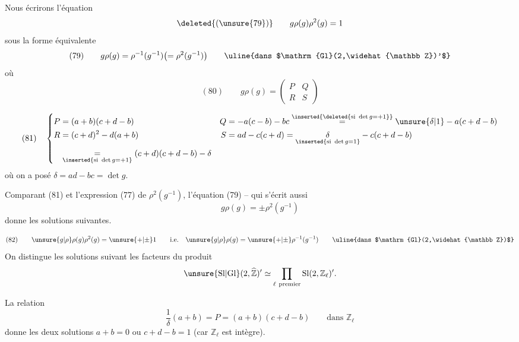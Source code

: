 Nous écrirons l'équation
\[
\deleted{(\unsure{79})}\qquad g\rho(g)\rho^2(g)=1
\]
sous la forme équivalente
\[
(79)\qquad g\rho(g)=\rho^{-1}(g^{-1})\bigl(=\rho^2(g^{-1})\bigr)
\qquad\text{\uline{dans $\mathrm{Gl}(2,\widehat{\mathbb Z})'$}}
\]
où
\[
(80)\qquad g\rho(g)=\begin{pmatrix}P&Q\\R&S\end{pmatrix}
\]


\[
(81)\quad
\left\{\begin{aligned}
P&=(a+b)(c+d-b)&Q&=-a(c-b)-bc\overset{\inserted{\deleted{\text{si }\det g=+1}}}{=}\unsure{\delta|1}-a(c+d-b)\\
R&=(c+d)^2-d(a+b)&S&=ad-c(c+d)=\underset{\inserted{\text{si }\det g=1}}{\delta}-c(c+d-b)\\
&\underset{\inserted{\text{si }\det g=+1}}{=}(c+d)(c+d-b)-\delta
\end{aligned}\right.
\]
où on a posé $\delta=ad-bc=\det g$.

Comparant (81) et l'expression (77) de $\rho^2(g^{-1})$, l'équation (79) -- qui s'écrit aussi
\[
g\rho(g)=\pm\rho^2(g^{-1})
\]
donne les solutions suivantes.


\[
(82)\qquad \unsure{g|\rho}\rho(g)\rho^2(g)=\unsure{+|\pm}1\qquad\text{i.e.}\quad \unsure{g|\rho}\rho(g)=\unsure{+|\pm}\rho^{-1}(g^{-1})\qquad\text{\uline{dans $\mathrm{Gl}(2,\widehat{\mathbb Z})$}}
\]
On distingue les solutions suivant les facteurs du produit
\[
\unsure{\mathrm{Sl}|\mathrm{Gl}}(2,\widehat{\mathbb Z})'\simeq\prod_{\ell\ \mathrm{premier}}\mathrm{Sl}(2,\mathbb Z_\ell)'.
\]

La relation
\[
\frac1\delta(a+b)=P=(a+b)(c+d-b)\qquad\text{dans }\mathbb Z_\ell
\]
donne les deux solutions $a+b=0$ ou $c+d-b=1$ (car $\mathbb Z_\ell$ est intègre).


